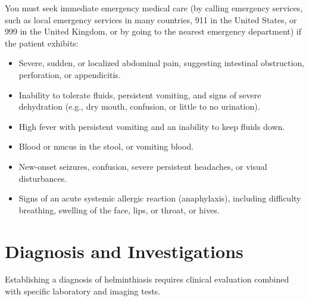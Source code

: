 You must seek immediate emergency medical care (by calling emergency services, such as local emergency services in many countries, 911 in the United States, or 999 in the United Kingdom, or by going to the nearest emergency department) if the patient exhibits:
\begin{itemize}
    \item Severe, sudden, or localized abdominal pain, suggesting intestinal obstruction, perforation, or appendicitis.
    \item Inability to tolerate fluids, persistent vomiting, and signs of severe dehydration (e.g., dry mouth, confusion, or little to no urination).
    \item High fever with persistent vomiting and an inability to keep fluids down.
    \item Blood or mucus in the stool, or vomiting blood.
    \item New-onset seizures, confusion, severe persistent headaches, or visual disturbances.
    \item Signs of an acute systemic allergic reaction (anaphylaxis), including difficulty breathing, swelling of the face, lips, or throat, or hives.
\end{itemize}

\section*{Diagnosis and Investigations}
Establishing a diagnosis of helminthiasis requires clinical evaluation combined with specific laboratory and imaging tests.

